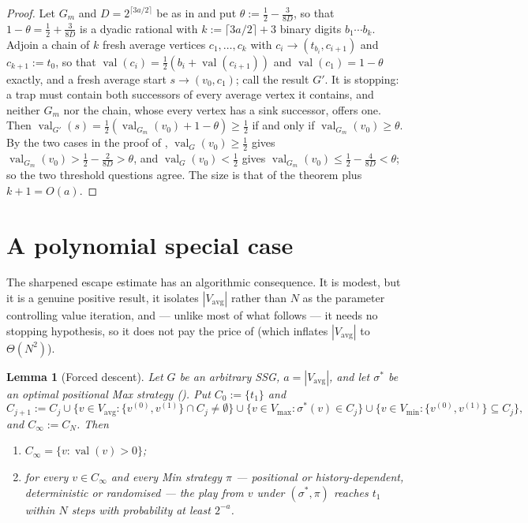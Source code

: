\documentclass[11pt]{article}
\theoremstyle{plain}
\newtheorem{lemma}[theorem]{Lemma}
\theoremstyle{definition}
\DeclareMathOperator{\val}{val}
\newcommand{\Vmax}{V_{\max}}
\newcommand{\Vmin}{V_{\min}}
\newcommand{\Vavg}{V_{\mathrm{avg}}}
\begin{document}
\begin{proof}
Let $G_m$ and $D=2^{\lceil3a/2\rceil}$ be as in 
and put $\theta:=\tfrac12-\tfrac3{8D}$, so that $1-\theta=\tfrac12+\tfrac3{8D}$
is a dyadic rational with $k:=\lceil3a/2\rceil+3$ binary digits
$b_1\cdots b_k$. Adjoin a chain of $k$ fresh average vertices
$c_1,\dots,c_k$ with $c_i\to(t_{b_i},c_{i+1})$ and $c_{k+1}:=t_0$, so that
$\val(c_i)=\tfrac12(b_i+\val(c_{i+1}))$ and $\val(c_1)=1-\theta$ exactly, and
a fresh average start $s\to(v_0,c_1)$; call the result $G'$. It is
stopping: a trap must contain both successors of every average vertex it
contains, and neither $G_m$ nor the chain, whose every vertex has a sink
successor, offers one. Then
$\val_{G'}(s)=\tfrac12(\val_{G_m}(v_0)+1-\theta)\ge\tfrac12$ if and only if
$\val_{G_m}(v_0)\ge\theta$. By the two cases in the proof of
, $\val_G(v_0)\ge\tfrac12$ gives
$\val_{G_m}(v_0)>\tfrac12-\tfrac2{8D}>\theta$, and $\val_G(v_0)<\tfrac12$
gives $\val_{G_m}(v_0)\le\tfrac12-\tfrac4{8D}<\theta$; so the two
threshold questions agree. The size is that of the theorem plus $k+1=O(a)$.
\end{proof}

\section{A polynomial special case}\label{sec:special}

The sharpened escape estimate has an algorithmic consequence. It is
modest, but it is a genuine positive result, it isolates $|\Vavg|$ rather
than $N$ as the parameter controlling value iteration, and --- unlike
most of what follows --- it needs no stopping hypothesis, so it does not
pay the price of  (which inflates $|\Vavg|$
to $\Theta(N^2)$).

\begin{lemma}[Forced descent]\label{lem:descent}
Let $G$ be an arbitrary SSG, $a=|\Vavg|$, and let $\sigma^\ast$ be an
optimal positional Max strategy (). Put
$C_0:=\{t_1\}$ and
\[
  C_{j+1}:=C_j\cup\bigl\{v\in\Vavg:\{v^{(0)},v^{(1)}\}\cap C_j\ne\emptyset\bigr\}
  \cup\bigl\{v\in\Vmax:\sigma^\ast(v)\in C_j\bigr\}
  \cup\bigl\{v\in\Vmin:\{v^{(0)},v^{(1)}\}\subseteq C_j\bigr\},
\]
and $C_\infty:=C_{N}$. Then
\begin{enumerate}[label=(\alph*),leftmargin=2.2em]
\item $C_\infty=\{v:\val(v)>0\}$;
\item for every $v\in C_\infty$ and \emph{every} Min strategy $\pi$ ---
  positional or history-dependent, deterministic or randomised --- the
  play from $v$ under $(\sigma^\ast,\pi)$ reaches $t_1$ within $N$ steps
  with probability at least $2^{-a}$.
\end{enumerate}
\end{lemma}
\end{document}
